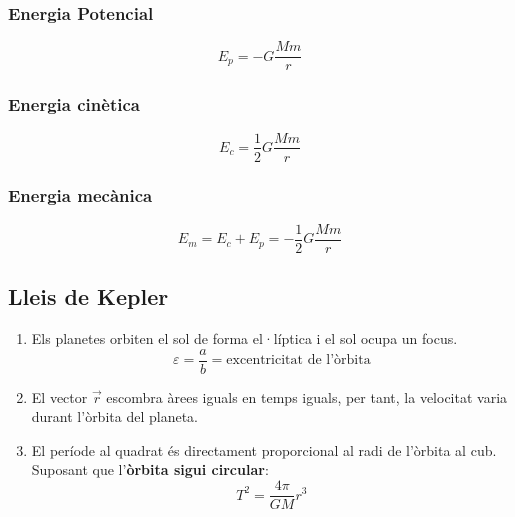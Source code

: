 \begin{multicols}{2}
    \subsubsection{Energia Potencial}
    \label{ssub:energia_potencial}
    \begin{equation}
        E_p = -G \frac{Mm}{r}
    \end{equation}

    \subsubsection{Energia cinètica}
    \label{ssub:energia_cinetica}
    \begin{equation}
        E_c = \frac{1}{2} G\frac{Mm}{r}
    \end{equation}

    \subsubsection{Energia mecànica}
    \label{ssub:energia_mecanica}
    \begin{equation}
        E_m = E_c + E_p = -\frac{1}{2} G \frac{Mm}{r}
    \end{equation}
\end{multicols}

\pagebreak

\subsection{Lleis de Kepler}
\label{sub:lleis_de_kepler}

\begin{enumerate}
    \item Els planetes orbiten el sol de forma el·líptica i el sol ocupa un focus.
        \begin{equation}
            \varepsilon = \frac{a}{b} = \text{excentricitat de l'òrbita}
        \end{equation}
    \item El vector $\vec{r}$ escombra àrees iguals en temps iguals, per tant, la velocitat varia durant l'òrbita del planeta. 
    \item El període al quadrat és directament proporcional al radi de l'òrbita al cub. Suposant que l'\textbf{òrbita sigui circular}:
        \vspace{1cm}
        \begin{equation}
            T^2 = \frac{4\pi}{GM}r^3
        \end{equation}
\end{enumerate}

